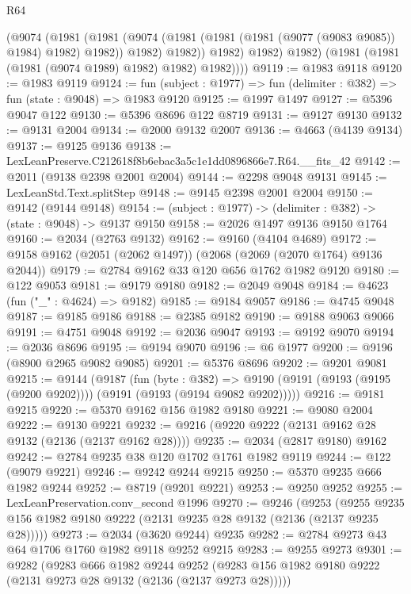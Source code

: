 \begin{lexlean}{R64}
\begin{coremodule}
                (@9074
                  (@1981
                    (@1981
                      (@9074 (@1981 (@1981 (@1981 (@9077 (@9083 @9085)) @1984) @1982) @1982))
                      @1982)
                    @1982))
                @1982)
              @1982)
            @1982)
          (@1981 (@1981 (@1981 (@9074 @1989) @1982) @1982) @1982))))
@9119 := @1983 @9118
@9120 := @1983 @9119
@9124 := fun (subject : @1977) => fun (delimiter : @382) => fun (state : @9048) => @1983 @9120
@9125 := @1997 @1497
@9127 := @5396 @9047 @122
@9130 := @5396 @8696 @122 @8719
@9131 := @9127 @9130
@9132 := @9131 @2004
@9134 := @2000 @9132 @2007
@9136 := @4663 (@4139 @9134)
@9137 := @9125 @9136
@9138 := LexLeanPreserve.C212618f8b6ebac3a5c1e1dd0896866e7.R64.__fits_42
@9142 := @2011 (@9138 @2398 @2001 @2004)
@9144 := @2298 @9048 @9131
@9145 := LexLeanStd.Text.splitStep
@9148 := @9145 @2398 @2001 @2004
@9150 := @9142 (@9144 @9148)
@9154 := (subject : @1977) -> (delimiter : @382) -> (state : @9048) -> @9137 @9150
@9158 := @2026 @1497 @9136 @9150 @1764
@9160 := @2034 (@2763 @9132)
@9162 := @9160 (@4104 @4689)
@9172 := @9158 @9162 (@2051 (@2062 @1497)) (@2068 (@2069 (@2070 @1764) @9136 @2044))
@9179 := @2784 @9162 @33 @120 @656 @1762 @1982 @9120
@9180 := @122 @9053
@9181 := @9179 @9180
@9182 := @2049 @9048
@9184 := @4623 (fun ("_" : @4624) => @9182)
@9185 := @9184 @9057
@9186 := @4745 @9048
@9187 := @9185 @9186
@9188 := @2385 @9182
@9190 := @9188 @9063 @9066
@9191 := @4751 @9048
@9192 := @2036 @9047
@9193 := @9192 @9070
@9194 := @2036 @8696
@9195 := @9194 @9070
@9196 := @6 @1977
@9200 := @9196 (@8900 @2965 @9082 @9085)
@9201 := @5376 @8696
@9202 := @9201 @9081
@9215 := @9144
    (@9187
      (fun (byte : @382) =>
      @9190 (@9191 (@9193 (@9195 (@9200 @9202)))) (@9191 (@9193 (@9194 @9082 @9202)))))
@9216 := @9181 @9215
@9220 := @5370 @9162 @156 @1982 @9180
@9221 := @9080 @2004
@9222 := @9130 @9221
@9232 := @9216 (@9220 @9222 (@2131 @9162 @28 @9132 (@2136 (@2137 @9162 @28))))
@9235 := @2034 (@2817 @9180) @9162
@9242 := @2784 @9235 @38 @120 @1702 @1761 @1982 @9119
@9244 := @122 (@9079 @9221)
@9246 := @9242 @9244 @9215
@9250 := @5370 @9235 @666 @1982 @9244
@9252 := @8719 (@9201 @9221)
@9253 := @9250 @9252
@9255 := LexLeanPreservation.conv_second @1996
@9270 := @9246
    (@9253 (@9255 @9235 @156 @1982 @9180 @9222 (@2131 @9235 @28 @9132 (@2136 (@2137 @9235 @28)))))
@9273 := @2034 (@3620 @9244) @9235
@9282 := @2784 @9273 @43 @64 @1706 @1760 @1982 @9118 @9252 @9215
@9283 := @9255 @9273
@9301 := @9282
    (@9283
      @666
      @1982
      @9244
      @9252
      (@9283 @156 @1982 @9180 @9222 (@2131 @9273 @28 @9132 (@2136 (@2137 @9273 @28)))))

\end{coremodule}
\end{lexlean}
